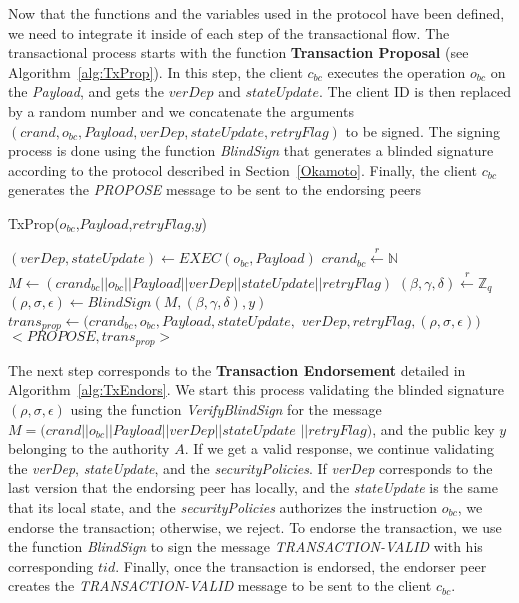 \documentclass[conference]{llncs}
\begin{document}
Now that the functions and the variables used in the protocol have been defined, we need to integrate it inside of each step of the transactional flow. The transactional process starts with the function \textbf{Transaction Proposal} (see Algorithm~\ref{alg:TxProp}). In this step, the client $c_{bc}$ executes the operation $o_{bc}$ on the \textit{Payload}, and gets the $verDep$ and $stateUpdate$. The client ID is then replaced by a random number and we concatenate the arguments $(crand,o_{bc},Payload, verDep,stateUpdate,retryFlag)$ to be signed. The signing process is done using the function \textit{BlindSign} that generates a blinded signature according to the protocol described in Section~\ref{Okamoto}. Finally, the client $c_{bc}$ generates the \textit{PROPOSE} message to be sent to the endorsing peers 

\begin{algorithm}[ht]
\caption{TxProp($o_{bc}$,$Payload$,$retryFlag$,$y$)}
\label{alg:TxProp}
\begin{algorithmic}[1]
\STATE $(verDep,stateUpdate) \gets EXEC(o_{{bc}},Payload)$ 
\STATE $crand_{bc}\xleftarrow[]{r}\mathbb{N}$ 
\STATE $M \gets (crand_{bc}||o_{bc}||Payload||verDep||stateUpdate||retryFlag)$
\STATE $(\beta,\gamma,\delta)\xleftarrow[]{r}\mathbb{Z}_q$  
\STATE $(\rho,\sigma,\epsilon) \gets BlindSign(M,(\beta,\gamma,\delta),y)$
\STATE $trans_{prop} \gets (crand_{bc},o_{bc},Payload,stateUpdate,$ $verDep, retryFlag,(\rho,\sigma,\epsilon))$
\RETURN $<\textit{PROPOSE},trans_{prop}>$
\end{algorithmic}
\end{algorithm}

The next step corresponds to the \textbf{Transaction Endorsement} detailed in Algorithm~\ref{alg:TxEndors}. We start this process validating the blinded signature $(\rho,\sigma,\epsilon)$ using the function \textit{VerifyBlindSign} for the message $M=(crand\vert\vert o_{bc} \vert\vert Payload \vert\vert verDep \vert\vert stateUpdate$ $\vert\vert retryFlag)$, and the public key $y$ belonging to the authority $A$. If we get a valid response, we continue validating the \textit{verDep}, \textit{stateUpdate}, and the \textit{securityPolicies}. If \textit{verDep} corresponds to the last version that the endorsing peer has locally, and the \textit{stateUpdate} is the same that its local state, and the \textit{securityPolicies} authorizes the instruction $o_{bc}$, we endorse the transaction; otherwise, we reject. To endorse the transaction, we use the function \textit{BlindSign} to sign the message \textit{TRANSACTION-VALID} with his corresponding $tid$. Finally, once the transaction is endorsed, the endorser peer creates the \textit{TRANSACTION-VALID} message to be sent to the client $c_{bc}$.
\end{document}
